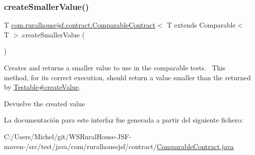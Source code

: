 \subsubsection{\texorpdfstring{createSmallerValue()}{createSmallerValue()}}
{\footnotesize\ttfamily T \mbox{\hyperlink{interfacecom_1_1ruralhousejsf_1_1contract_1_1_comparable_contract}{com.\+ruralhousejsf.\+contract.\+Comparable\+Contract}}$<$ T extends Comparable$<$ T $>$.create\+Smaller\+Value (\begin{DoxyParamCaption}{ }\end{DoxyParamCaption})}

Creates and returns a smaller value to use in the comparable tests.~\newline
 This method, for its correct execution, should return a value smaller than the returned by \mbox{\hyperlink{interfacecom_1_1ruralhousejsf_1_1contract_1_1_testable_ae4546a381488faaba1ef7c0f8688de9c}{Testable\#create\+Value}}.

\begin{DoxyReturn}{Devuelve}
the created value 
\end{DoxyReturn}


La documentación para este interfaz fue generada a partir del siguiente fichero\+:\begin{DoxyCompactItemize}
\item 
C\+:/\+Users/\+Michel/git/\+W\+S\+Rural\+House-\/\+J\+S\+F-\/maven-\//src/test/java/com/ruralhousejsf/contract/\mbox{\hyperlink{_comparable_contract_8java}{Comparable\+Contract.\+java}}\end{DoxyCompactItemize}
